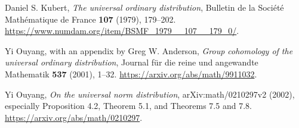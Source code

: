 Daniel S. Kubert,
\emph{The universal ordinary distribution},
Bulletin de la Soci\'et\'e Math\'ematique de France
\textbf{107} (1979), 179--202.
\url{https://www.numdam.org/item/BSMF_1979__107__179_0/}.

Yi Ouyang, with an appendix by Greg W. Anderson,
\emph{Group cohomology of the universal ordinary distribution},
Journal f\"ur die reine und angewandte Mathematik
\textbf{537} (2001), 1--32.
\url{https://arxiv.org/abs/math/9911032}.

Yi Ouyang,
\emph{On the universal norm distribution},
arXiv:math/0210297v2 (2002), especially Proposition 4.2,
Theorem 5.1, and Theorems 7.5 and 7.8.
\url{https://arxiv.org/abs/math/0210297}.
